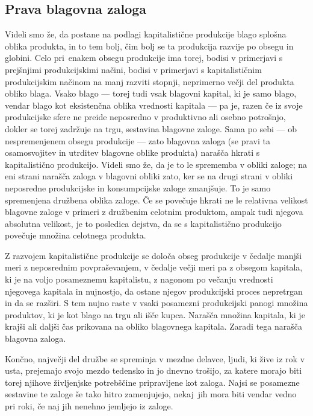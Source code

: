 \documentclass[kapital_02.tex]{subfiles}
\begin{document}
\subsection{Prava blagovna zaloga}
Videli smo že, da postane na podlagi kapitalistične produkcije blago splošna oblika produkta, in to tem bolj, čim bolj se ta produkcija razvije po obsegu in globini.
Celo pri\KPEstran\ enakem obsegu produkcije ima torej, bodisi v primerjavi s prejšnjimi produkcijskimi načini, bodisi v primerjavi s kapitalističnim produkcijskim načinom na manj razviti stopnji, neprimerno večji del produkta obliko blaga.
Vsako blago — torej tudi vsak blagovni kapital, ki je samo blago, vendar blago kot eksistenčna oblika vrednosti kapitala — pa je, razen če iz svoje produkcijske sfere ne preide neposredno v produktivno ali osebno potrošnjo, dokler se torej zadržuje na trgu, sestavina blagovne zaloge.
Sama po sebi — ob nespremenjenem obsegu produkcije — zato blagovna zaloga (se pravi ta osamosvojitev in utrditev blagovne oblike produkta) narašča hkrati s kapitalistično produkcijo.
Videli smo že, da je to le sprememba v obliki zaloge; na eni strani narašča zaloga v blagovni obliki zato, ker se na drugi strani v obliki neposredne produkcijske in konsumpcijske zaloge zmanjšuje.
To je samo spremenjena družbena oblika zaloge.
Če se povečuje hkrati ne le relativna velikost blagovne zaloge v primeri z družbenim celotnim produktom, ampak tudi njegova absolutna velikost, je to posledica dejstva, da se s kapitalistično produkcijo povečuje množina celotnega produkta.

Z razvojem kapitalistične produkcije se določa obseg produkcije v čedalje manjši meri z neposrednim povpraševanjem, v čedalje večji meri pa z obsegom kapitala, ki je na voljo posameznemu kapitalistu, z nagonom po večanju vrednosti njegovega kapitala in nujnostjo, da ostane njegov produkcijski proces nepretrgan in da se razširi.
S tem nujno raste v vsaki posamezni produkcijski panogi množina produktov, ki je kot blago na trgu ali išče kupca.
Narašča množina kapitala, ki je krajši ali daljši čas prikovana na obliko blagovnega kapitala.
Zaradi tega narašča blagovna zaloga.

Končno, največji del družbe se spreminja v mezdne delavce, ljudi, ki žive iz rok v usta, prejemajo svojo mezdo tedensko in jo dnevno trošijo, za katere morajo biti torej njihove življenjske potrebščine pripravljene kot zaloga.
Najsi se posamezne sestavine te zaloge še tako hitro zamenjujejo, nekaj\KPEstran\ jih mora biti vendar vedno pri roki, če naj jih nenehno jemljejo iz zaloge.
\end{document}

